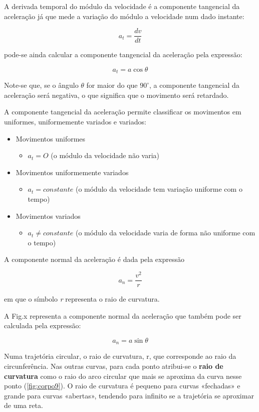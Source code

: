 \documentclass[a4paper,11pt,oneside]{report}
\begin{document}
A derivada temporal do módulo da velocidade é a componente tangencial da 
aceleração já que mede a variação do módulo a velocidade num dado instante:

\[
a_t = \frac{dv}{dt}
\]

\noindent pode-se ainda calcular a componente tangencial da aceleração pela expressão: 

\[
a_t = a\cos \theta
\]

Note-se que, se o ângulo $\theta$ for maior do que $90^\circ$, a componente 
tangencial da aceleração será negativa, o que significa que o movimento será 
retardado.

A componente tangencial da aceleração permite classificar os movimentos em 
uniformes, uniformemente variados e variados:

\begin{itemize}
    \item Movimentos uniformes
     \begin{itemize}
     \item $a_t = O$ (o módulo da velocidade não varia)
     \end{itemize}
    \item Movimentos uniformemente variados
    \begin{itemize}
     \item $a_t = constante$ (o módulo da velocidade tem variação uniforme com o tempo)
    \end{itemize}
    \item Movimentos variados
     \begin{itemize}
     \item $a_t \ne constante$ (o módulo da velocidade varia de forma não uniforme com o tempo)
    \end{itemize}
\end{itemize}

A componente normal da aceleração é dada pela expressão

\[
a_n = \frac{v^2}{r}
\]

\noindent em que o símbolo \textit{r} representa o raio de curvatura.

A Fig.x representa a componente normal da aceleração que também pode ser 
calculada pela expressão:

\[
a_n = a\sin\theta
\]

Numa trajetória circular, o raio de curvatura, r, que corresponde ao raio da
circunferência. Nas outras curvas, para cada ponto atribui-se o \textbf{raio de curvatura} 
como o raio do arco circular que mais se aproxima da curva nesse ponto (\autoref{fig:corpo9}). 
O raio de curvatura é pequeno para curvas «fechadas» e grande para curvas «abertas», 
tendendo para infinito se a trajetória se aproximar de uma reta.
\end{document}
